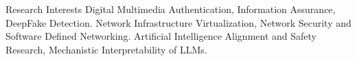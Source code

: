 \begin{rubric}{Research Interests}
    \entry*[]
    Digital Multimedia Authentication, Information Assurance, DeepFake Detection.
    \entry*[]
    Network Infrastructure Virtualization, Network Security and Software Defined Networking. 
    \entry*[]
    Artificial Intelligence Alignment and Safety Research, Mechanistic Interpretability of LLMs.
\end{rubric}